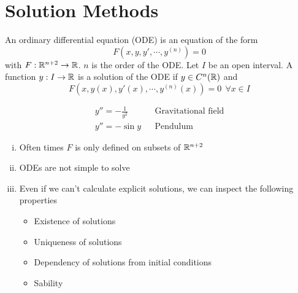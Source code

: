 \documentclass[../../script.tex]{subfiles}
\begin{document}
\section{Solution Methods}

\begin{defi}
    An ordinary differential equation (ODE) is an equation of the form 
    \[
        F(x, y, y', \cdots, y^{(n)}) = 0
    \]
    with $F: \mathbb{R}^{n+2} \rightarrow \mathbb{R}$. $n$ is the order of the ODE.
    Let $I$ be an open interval. A function $y: I \rightarrow \mathbb{R}$ is a solution of the ODE if $y \in C^n(\mathbb{R})$ and 
    \[
        F(x, y(x), y'(x), \cdots, y^{(n)}(x)) = 0 ~~\forall x \in I
    \]
\end{defi}

\begin{eg}
    \begin{align*}
        y'' = -\frac{1}{y^2} && \text{Gravitational field} \\
        y'' = -\sin y && \text{Pendulum}
    \end{align*}
\end{eg}

\begin{rem}
    \begin{enumerate}[(i)]
        \item Often times $F$ is only defined on subsets of $\mathbb{R}^{n+2}$
        \item ODEs are not simple to solve
        \item Even if we can't calculate explicit solutions, we can inspect the following properties
        \begin{itemize}
            \item Existence of solutions
            \item Uniqueness of solutions
            \item Dependency of solutions from initial conditions
            \item Sability
        \end{itemize}
    \end{enumerate}
\end{rem}
\end{document}
